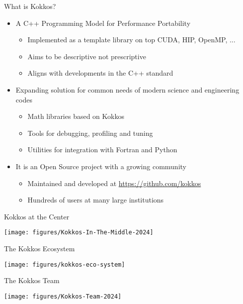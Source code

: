 \begin{frame}[fragile]{What is Kokkos?}
	\begin{itemize}
		\item A C++ Programming Model for Performance Portability
			\begin{itemize}
				\item Implemented as a template library on top CUDA, HIP, OpenMP, ...
				\item Aims to be descriptive not prescriptive
				\item Aligns with developments in the C++ standard
			\end{itemize}
		\item Expanding solution for common needs of modern science and engineering codes
			\begin{itemize}
				\item Math libraries based on Kokkos
				\item Tools for debugging, profiling and tuning
				\item Utilities for integration with Fortran and Python
			\end{itemize}
		\item It is an Open Source project with a growing community
			\begin{itemize}
				\item Maintained and developed at \url{https://github.com/kokkos}
				\item Hundreds of users at many large institutions
			\end{itemize}
	\end{itemize}
\end{frame}

\begin{frame}[fragile]{Kokkos at the Center}
  \begin{center}
    \texttt{[image: figures/Kokkos-In-The-Middle-2024]}
  \end{center}
\end{frame}

\begin{frame}[fragile]{The Kokkos Ecosystem}
  \begin{center}
    \texttt{[image: figures/kokkos-eco-system]}
  \end{center}
\end{frame}

\begin{frame}[fragile]{The Kokkos Team}
  \begin{center}
    \texttt{[image: figures/Kokkos-Team-2024]}
  \end{center}
\end{frame}


